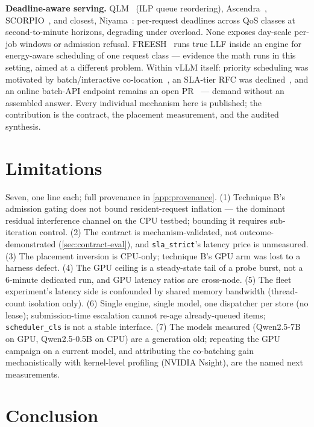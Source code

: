 \documentclass[11pt]{article}
\newcommand{\code}[1]{\texttt{#1}}
\begin{document}
\textbf{Deadline-aware serving.} QLM~\citep{qlm} (ILP queue reordering),
Ascendra~\citep{ascendra}, SCORPIO~\citep{scorpio}, and closest,
Niyama~\citep{niyama}: per-request deadlines across QoS classes at second-to-minute
horizons, degrading under overload. None exposes day-scale per-job windows or admission
refusal. FREESH~\citep{freesh} runs true LLF inside an engine for energy-aware
scheduling of one request class --- evidence the math runs in this setting, aimed at a
different problem. Within vLLM itself: priority scheduling was motivated by
batch/interactive co-location~\citep{vllm-rfc-6077}, an SLA-tier RFC was
declined~\citep{vllm-rfc-30256}, and an online batch-API endpoint remains an open
PR~\citep{vllm-pr-44445} --- demand without an assembled answer. Every individual
mechanism here is published; the contribution is the contract, the placement
measurement, and the audited synthesis.

\section{Limitations}
\label{sec:limitations}

Seven, one line each; full provenance in \cref{app:provenance}.
(1) Technique B's admission gating does not bound resident-request inflation --- the
dominant residual interference channel on the CPU testbed; bounding it requires
sub-iteration control. (2) The contract is mechanism-validated, not
outcome-demonstrated (\cref{sec:contract-eval}), and \code{sla\_strict}'s latency price
is unmeasured. (3) The placement inversion is CPU-only; technique B's GPU arm was lost
to a harness defect. (4) The GPU ceiling is a steady-state tail of a probe burst, not a
6-minute dedicated run, and GPU latency ratios are cross-node. (5) The fleet experiment's
latency side is confounded by shared memory bandwidth (thread-count isolation only).
(6) Single engine, single model, one dispatcher per store (no lease);
submission-time escalation cannot re-age already-queued items; \code{scheduler\_cls} is
not a stable interface. (7) The models measured (Qwen2.5-7B on GPU, Qwen2.5-0.5B on
CPU) are a generation old; repeating the GPU campaign on a current model, and
attributing the co-batching gain mechanistically with kernel-level profiling (NVIDIA
Nsight), are the named next measurements.

\section{Conclusion}
\end{document}
